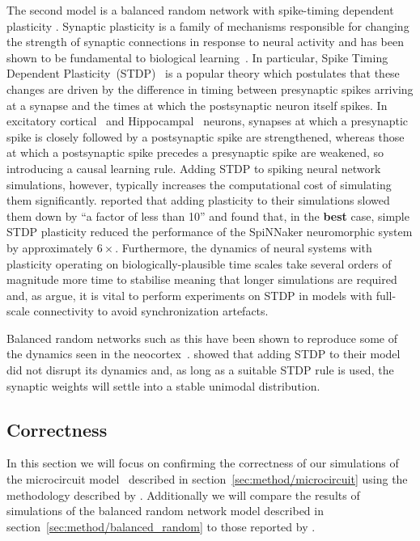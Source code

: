 \documentclass[utf8]{frontiersSCNS} %
\begin{document}
The second model is a balanced random network with spike-timing dependent plasticity \citep{Morrison2007}. 
Synaptic plasticity is a family of mechanisms responsible for changing the strength of synaptic connections in response to neural activity and has been shown to be fundamental to biological learning~\citep{Nabavi2014}.
In particular, Spike Timing Dependent Plasticity~(STDP)~\citep{Markram1997,Bi1998} is a popular theory which postulates that these changes are driven by the difference in timing between presynaptic spikes arriving at a synapse and the times at which the postsynaptic neuron itself spikes.
In excitatory cortical~\citep{Markram1997} and Hippocampal~\citep{Bi1998} neurons, synapses at which a presynaptic spike is closely followed by a postsynaptic spike are strengthened, whereas those at which a postsynaptic spike precedes a presynaptic spike are weakened, so introducing a causal learning rule.
Adding STDP to spiking neural network simulations, however, typically increases the computational cost of simulating them significantly. 
\citet{Morrison2007} reported that adding plasticity to their simulations slowed them down by ``a factor of less than 10'' and \citet{Knight2016b} found that, in the \textbf{best} case, simple STDP plasticity reduced the performance of the SpiNNaker neuromorphic system by approximately $6\times$.
Furthermore, the dynamics of neural systems with plasticity operating on biologically-plausible time scales take several orders of magnitude more time to stabilise meaning that longer simulations are required and, as \citeauthor{Morrison2007} argue, it is vital to perform experiments on STDP in models with full-scale connectivity to avoid synchronization artefacts.

Balanced random networks such as this have been shown to reproduce some of the dynamics seen in the neocortex~\citep{Brunel1999,Brunel2000}. 
\citeauthor{Morrison2007} showed that adding STDP to their model did not disrupt its dynamics and, as long as a suitable STDP rule is used, the synaptic weights will settle into a stable unimodal distribution.

\subsection{Correctness}
\label{sec:results/correctness}
In this section we will focus on confirming the correctness of our simulations of the microcircuit model~\citep{Potjans2012} described in section~\ref{sec:method/microcircuit} using the methodology described by \citet{VanAlbada2018}.
Additionally we will compare the results of simulations of the balanced random network model described in section~\ref{sec:method/balanced_random} to those reported by \citet{Morrison2007}.
\end{document}
